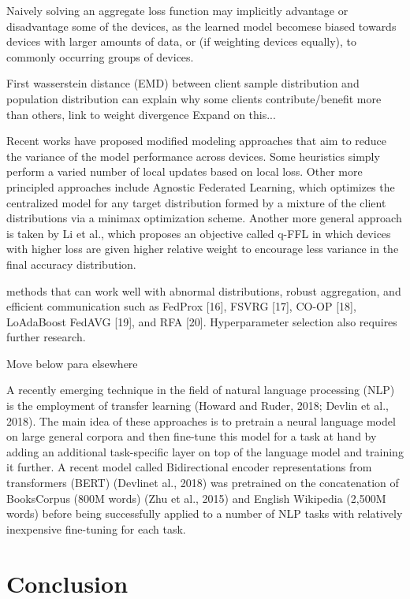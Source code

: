 \documentclass[letterpaper]{article} %
\begin{document}
Naively solving an aggregate loss function may implicitly advantage or disadvantage some of the devices, as the learned model becomese biased towards devices with larger amounts of data, or (if weighting devices equally), to commonly occurring groups of devices. 

First wasserstein distance (EMD) between client sample distribution and population distribution can explain why some clients contribute/benefit more than others, link to weight divergence Expand on this...

Recent works have proposed modified modeling approaches that aim to reduce the variance of the model performance across devices. Some heuristics simply perform a varied number of local updates based
on local loss. Other more principled approaches include Agnostic Federated Learning, which optimizes the centralized model for any target distribution formed by a mixture of the client distributions via a minimax optimization scheme. Another more general approach is taken by Li et al., which proposes an objective called q-FFL in which devices with higher loss are given higher relative weight to encourage less variance in the final accuracy distribution.

methods that can work
well with abnormal distributions, robust aggregation, and
efficient communication such as FedProx [16], FSVRG [17],
CO-OP [18], LoAdaBoost FedAVG [19], and RFA [20].
Hyperparameter selection also requires further research.

Move below para elsewhere

A recently emerging technique in the field of natural language processing (NLP) is the employment of transfer learning (Howard and Ruder, 2018; Devlin et al., 2018). The main idea of these approaches is to pretrain a neural language model on large general corpora and then fine-tune this model for a task at hand by adding an additional task-specific layer on top of the language model and training it further. A recent model called Bidirectional encoder representations from transformers (BERT) (Devlinet al., 2018) was pretrained on the concatenation of BooksCorpus (800M words) (Zhu et al., 2015) and English Wikipedia (2,500M words) before being successfully applied to a number of NLP tasks with relatively inexpensive fine-tuning for each task.

\bigskip
\section{Conclusion}
\bigskip
\end{document}
